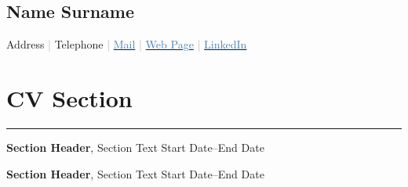 \documentclass{article}
\newcommand{\name}[1]{
    \begin{center}
        \vspace{-0.2cm}\section*{\huge #1}\vspace{-0.2cm}
    \end{center}
}
\newcommand{\info}[1]{
    \begin{center}
        \vspace{-0.2cm}#1\vspace{-0.2cm}
    \end{center}
}
\newcommand{\cvsection}[1]{
    \vspace{-0.2cm}\section*{#1}\vspace{-0.2cm}\hrule\vspace{0.2cm}
}
\begin{document}
\name{Name Surname}
\info{
Address \textcolor[HTML]{a9a9a9}{|}
Telephone \textcolor[HTML]{a9a9a9}{|}
\href{mailto:mail}{\textcolor[HTML]{4682b4}{Mail}} \textcolor[HTML]{a9a9a9}{|}
\href{webpage}{\textcolor[HTML]{4682b4}{Web Page}} \textcolor[HTML]{a9a9a9}{|}
\href{linkedin}{\textcolor[HTML]{4682b4}{LinkedIn}}
}


\cvsection{CV Section}
\textbf{Section Header}, Section Text  \hfill Start Date–End Date

\textbf{Section Header}, Section Text  \hfill Start Date–End Date
\end{document}
